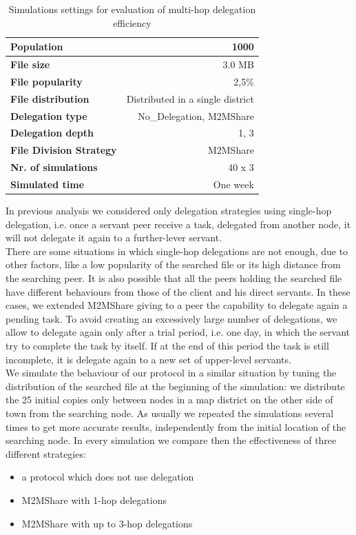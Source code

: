 \begin{table}[h]
\begin{center}
\begin{tabular}{|l|r|}
\hline
\bfseries Population & 1000 \\
\hline
\bfseries File size & 3.0 MB \\
\hline
\bfseries File popularity & 2,5\% \\
\hline
\bfseries File distribution & Distributed in a single district \\
\hline
\bfseries Delegation type & No\_Delegation, M2MShare\\
\hline
\bfseries Delegation depth & 1, 3 \\
\hline
\bfseries File Division Strategy & M2MShare \\
\hline
\bfseries Nr. of simulations & 40 x 3\\
\hline
\bfseries Simulated time & One week \\
\hline
\end{tabular}
\end{center}
\caption{Simulations settings for evaluation of multi-hop delegation efficiency\label{tab:settingsMultiHop}}
\end{table}
In previous analysis we considered only delegation strategies using single-hop delegation, i.e. once a servant peer receive a task, delegated from another node, it will not delegate it again to a further-lever servant. 
\\

There are some situations in which single-hop delegations are not enough, due to other factors, like a low popularity of the searched file or its high distance from the searching peer. It is also possible that all the peers holding the searched file have different behaviours from those of the client and his direct servants. In these cases, we extended M2MShare giving to a peer the capability to delegate again a pending task. To avoid creating an excessively large number of delegations, we allow to delegate again only after a trial period, i.e. one day, in which the servant try to complete the task by itself. If at the end of this period the task is still incomplete, it is delegate again to a new set of upper-level servants.
\\

We simulate the behaviour of our protocol in a similar situation by tuning the distribution of the searched file at the beginning of the simulation: we distribute the 25 initial copies only between nodes in a map district on the other side of town from the searching node. As usually we repeated the simulations several times to get more accurate results, independently from the initial location of the searching node. In every simulation we compare then the effectiveness of three different strategies:
\begin{itemize}
\item a protocol which does not use delegation
\item M2MShare with 1-hop delegations
\item M2MShare with up to 3-hop delegations
\end{itemize}

